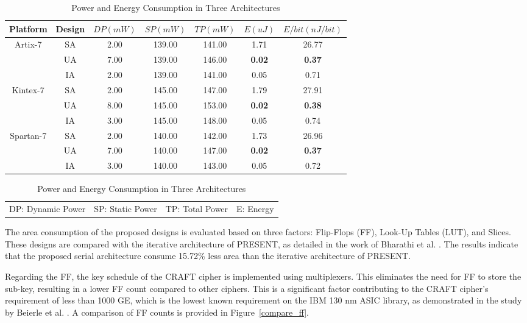 \documentclass[final,5p,times,twocolumn]{elsarticle}
\begin{document}
\begin{table}
    \begin{threeparttable}
        \caption{Power and Energy Consumption in Three Architectures}\label{power_energy_compare}%
        \begin{tabular*}{\textwidth}{@{\extracolsep\fill}|c|c|c|c|c|c|c|}
            \hline
            Platform & Design & $DP(mW)$ & $SP(mW)$ & $TP(mW)$ & $E(uJ)$ & $E/bit(nJ/bit)$ \\
            \hline
            \multirow{3}{*}{Artix-7}  & SA & 2.00 & 139.00 & 141.00 & 1.71 & 26.77 \\
            & UA & 7.00 & 139.00 & 146.00 & \textbf{0.02} & \textbf{0.37} \\
            & IA & 2.00 & 139.00 & 141.00 & 0.05 & 0.71 \\
            \hline
            \multirow{3}{*}{Kintex-7} & SA & 2.00 & 145.00 & 147.00 & 1.79 & 27.91 \\
            & UA & 8.00 & 145.00 & 153.00 & \textbf{0.02} & \textbf{0.38} \\
            & IA & 3.00 & 145.00 & 148.00 & 0.05 & 0.74 \\
            \hline
            \multirow{3}{*}{Spartan-7} & SA & 2.00 & 140.00 & 142.00 & 1.73 & 26.96 \\
            & UA & 7.00 & 140.00 & 147.00 & \textbf{0.02} & \textbf{0.37} \\
            & IA & 3.00 & 140.00 & 143.00 & 0.05 & 0.72 \\
            \hline
        \end{tabular*}
        \begin{tabular}{llll}
            DP: Dynamic Power & SP: Static Power & TP: Total Power & E: Energy
        \end{tabular}
    \end{threeparttable}
\end{table}

The area consumption of the proposed designs is evaluated based on three factors: Flip-Flops (FF), Look-Up Tables (LUT), and Slices. These designs are compared with the iterative architecture of PRESENT, as detailed in the work of Bharathi et al. \cite{Bharathi2022}. The results indicate that the proposed serial architecture consume 15.72\% less area than the iterative architecture of PRESENT.

Regarding the FF, the key schedule of the CRAFT cipher is implemented using multiplexers. This eliminates the need for FF to store the sub-key, resulting in a lower FF count compared to other ciphers. This is a significant factor contributing to the CRAFT cipher's requirement of less than 1000 GE, which is the lowest known requirement on the IBM 130 nm ASIC library, as demonstrated in the study by Beierle et al. \cite{Beierle2019}. A comparison of FF counts is provided in Figure~\ref{compare_ff}.
\end{document}
